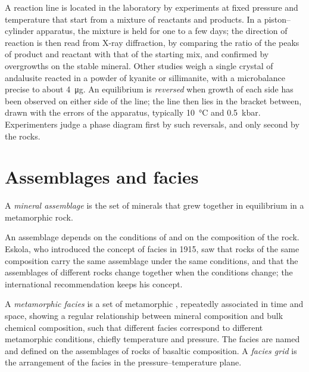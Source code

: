 \begin{inthelab}
A reaction line is located in the laboratory by experiments at fixed pressure and
temperature that start from a mixture of reactants and products. In a piston--cylinder
apparatus, the mixture is held for one to a few days; the direction of reaction is then
read from X-ray diffraction, by comparing the ratio of the peaks of product and reactant
with that of the starting mix, and confirmed by overgrowths on the stable mineral. Other
studies weigh a single crystal of andalusite reacted in a powder of kyanite or
sillimanite, with a microbalance precise to about \qty{4}{\micro g}. An equilibrium is
\emph{reversed} when growth of each side has been observed on either side of the line;
the line then lies in the bracket between, drawn with the errors of the apparatus,
typically \qty{10}{\celsius} and \qty{0.5}{kbar}. Experimenters judge a phase diagram first
by such reversals, and only second by the rocks.
\end{inthelab}

\section{Assemblages and facies}\label{sec:b2:metamorphic-facies:facies}

\begin{definition}\label{def:b2:metamorphic-facies:assemblage}
A \emph{mineral assemblage} is the set of minerals that grew
together in equilibrium in a metamorphic rock.
\end{definition}

An assemblage depends on the conditions of  and on the composition of the
rock. Eskola, who introduced the concept of facies in 1915, saw that rocks of the same
composition carry the same assemblage under the same conditions, and that the
assemblages of different rocks change together when the conditions change; the
international recommendation keeps his concept.

\begin{definition}\label{def:b2:metamorphic-facies:facies}
A \emph{metamorphic facies} is a set of metamorphic , repeatedly associated in time and space, showing a regular relationship
between mineral composition and bulk chemical composition, such that different facies
correspond to different metamorphic conditions, chiefly temperature and pressure. The
facies are named and defined on the assemblages of rocks of basaltic composition. A
\emph{facies grid} is the arrangement of the facies in the
pressure--temperature plane.
\end{definition}

